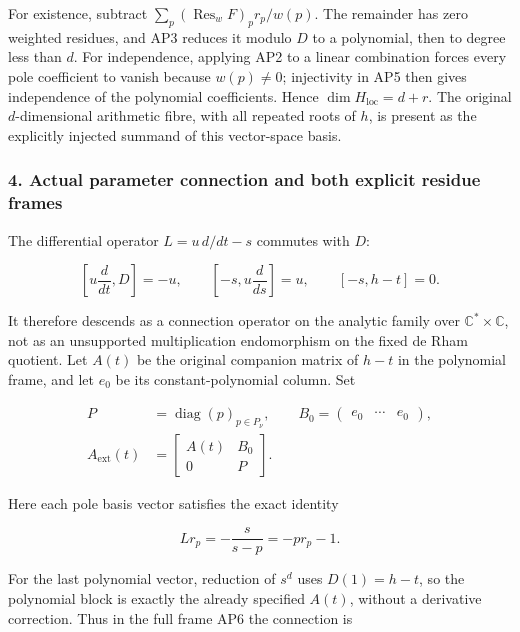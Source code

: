 For existence, subtract \(\sum_p (\operatorname{Res}_w F)_p r_p/w(p)\). The remainder has zero weighted residues, and AP3 reduces it modulo \(D\) to a polynomial, then to degree less than \(d\). For independence, applying AP2 to a linear combination forces every pole coefficient to vanish because \(w(p)\ne0\); injectivity in AP5 then gives independence of the polynomial coefficients. Hence \(\dim H_{\mathrm{loc}}=d+r\). The original \(d\)-dimensional arithmetic fibre, with all repeated roots of \(h\), is present as the explicitly injected summand of this vector-space basis.

\subsubsection{4. Actual parameter connection and both explicit residue frames}\label{endpoint-analytic_pole--actual-parameter-connection-and-both-explicit-residue-frames}

The differential operator \(L=u\,d/dt-s\) commutes with \(D\):

\[
\left[u\frac{d}{dt},D\right]=-u,\qquad
\left[-s,u\frac{d}{ds}\right]=u,\qquad [-s,h-t]=0.
\tag{AP7}
\]

It therefore descends as a connection operator on the analytic family over \(\mathbb{C}^{*}\times\mathbb{C}\), not as an unsupported multiplication endomorphism on the fixed de Rham quotient. Let \(A(t)\) be the original companion matrix of \(h-t\) in the polynomial frame, and let \(e_0\) be its constant-polynomial column. Set

\[
\begin{aligned}
P&=\operatorname{diag}(p)_{p\in P_\nu},\qquad
B_0=\begin{pmatrix}e_0&\cdots&e_0\end{pmatrix},\\
A_{\mathrm{ext}}(t)&=\begin{bmatrix}A(t)&B_0\\0&P\end{bmatrix}.
\end{aligned}
\tag{AP8}
\]

Here each pole basis vector satisfies the exact identity

\[
L r_p=-\frac{s}{s-p}=-p r_p-1.
\tag{AP9}
\]

For the last polynomial vector, reduction of \(s^d\) uses \(D(1)=h-t\), so the polynomial block is exactly the already specified \(A(t)\), without a derivative correction. Thus in the full frame AP6 the connection is


